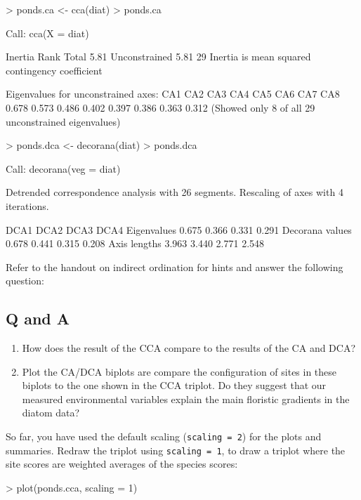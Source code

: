 \documentclass[a4paper,10pt]{article}
\begin{document}
\begin{Schunk}
\begin{Sinput}
> ponds.ca <- cca(diat)
> ponds.ca
\end{Sinput}
\begin{Soutput}
Call: cca(X = diat)

              Inertia Rank
Total            5.81     
Unconstrained    5.81   29
Inertia is mean squared contingency coefficient 

Eigenvalues for unconstrained axes:
  CA1   CA2   CA3   CA4   CA5   CA6   CA7   CA8 
0.678 0.573 0.486 0.402 0.397 0.386 0.363 0.312 
(Showed only 8 of all 29 unconstrained eigenvalues)
\end{Soutput}
\begin{Sinput}
> ponds.dca <- decorana(diat)
> ponds.dca
\end{Sinput}
\begin{Soutput}
Call:
decorana(veg = diat) 

Detrended correspondence analysis with 26 segments.
Rescaling of axes with 4 iterations.

                 DCA1  DCA2  DCA3  DCA4
Eigenvalues     0.675 0.366 0.331 0.291
Decorana values 0.678 0.441 0.315 0.208
Axis lengths    3.963 3.440 2.771 2.548
\end{Soutput}
\end{Schunk}

Refer to the handout on indirect ordination for hints and answer the following question:

\subsection*{Q and A}
\begin{enumerate}
\item How does the result of the CCA compare to the results of the CA and DCA?
\item Plot the CA/DCA biplots are compare the configuration of sites in these biplots to the one shown in the CCA triplot. Do they suggest that our measured environmental variables explain the main floristic gradients in the diatom data?
\end{enumerate}

So far, you have used the default scaling (\texttt{scaling = 2}) for the plots and summaries. Redraw the triplot using \texttt{scaling = 1}, to draw a triplot where the site scores are weighted averages of the species scores:

\begin{Schunk}
\begin{Sinput}
> plot(ponds.cca, scaling = 1)
\end{Sinput}
\end{Schunk}
\end{document}
